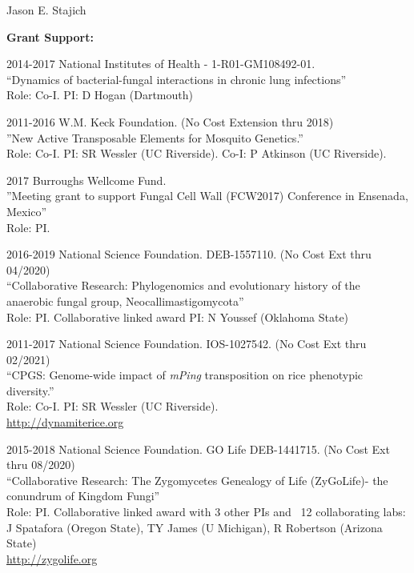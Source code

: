\documentclass[10pt]{article}
\begin{document}
\begin{cv}{\centerline{Jason E. Stajich}}
\begin{cvlistcompact}{\bf Grant Support:}
\item [2014-2017] National Institutes of Health - 1-R01-GM108492-01. \\
``Dynamics of bacterial-fungal interactions in chronic lung infections'' \\
  Role: Co-I. PI: D Hogan (Dartmouth)

  \item [2011-2016] W.M. Keck Foundation. (No Cost Extension thru 2018) \\
''New Active Transposable Elements for Mosquito Genetics.'' \\
Role: Co-I. PI: SR Wessler (UC Riverside). Co-I: P Atkinson (UC Riverside).

\item [2017] Burroughs Wellcome Fund. \\
''Meeting grant to support Fungal Cell Wall (FCW2017) Conference in Ensenada, Mexico'' \\
Role: PI.

\item [2016-2019] National Science Foundation. DEB-1557110. (No Cost Ext thru 04/2020) \\
``Collaborative Research: Phylogenomics and evolutionary history of the anaerobic fungal group, Neocallimastigomycota'' \\
Role: PI. Collaborative linked award PI: N Youssef (Oklahoma State)

\item [2011-2017] National Science Foundation. IOS-1027542.  (No Cost Ext thru 02/2021) \\
  ``CPGS: Genome-wide impact of \textit{mPing} transposition on rice phenotypic diversity.'' \\
Role: Co-I. PI: SR Wessler (UC Riverside). \\
\url{http://dynamiterice.org}

\item [2015-2018] National Science Foundation. GO Life DEB-1441715. (No Cost Ext thru 08/2020) \\
``Collaborative Research: The Zygomycetes Genealogy of Life
  (ZyGoLife)- the conundrum of Kingdom Fungi'' \\
  Role: PI. Collaborative linked award with 3 other PIs and ~12
  collaborating labs: J Spatafora (Oregon State), TY James (U
  Michigan), R Robertson (Arizona State) \\
\url{http://zygolife.org}


\end{cvlistcompact}
\end{cv}
\end{document}

